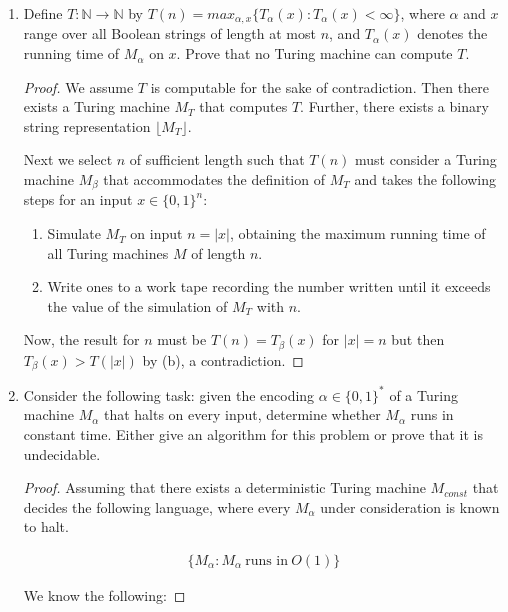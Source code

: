\documentclass[usletter]{article}
\begin{document}
\begin{enumerate}
  \item Define $T : \mathbb{N} \rightarrow \mathbb{N}$ by $T(n) = max_{\alpha,x}\{T_{\alpha}(x) : T_{\alpha}(x) < \infty \}$, where $\alpha$ and $x$ range over all Boolean strings of length at most $n$, and $T_{\alpha}(x)$ denotes the running time of $M_{\alpha}$ on $x$. Prove that no Turing machine can compute $T$.

    \begin{proof}
      We assume $T$ is computable for the sake of contradiction. Then there exists a Turing machine $M_T$ that computes $T$. Further, there exists a binary string representation $\lfloor M_T \rfloor$.

      Next we select $n$ of sufficient length such that $T(n)$ must consider a Turing machine $M_{\beta}$ that accommodates the definition of $M_T$ and takes the following steps for an input $x \in \{0,1\}^n$:
      \begin{enumerate}
        \item Simulate $M_T$ on input $n = |x|$, obtaining the maximum running time of all Turing machines $M$ of length $n$.
        \item Write ones to a work tape recording the number written until it exceeds the value of the simulation of $M_T$ with $n$.
      \end{enumerate}

      Now, the result for $n$ must be $T(n) = T_{\beta}(x)$ for $|x| = n$ but then $T_{\beta}(x) > T(|x|)$ by (b), a contradiction.
    \end{proof}

  \item Consider the following task: given the encoding $\alpha \in \{0,1\}^*$ of a Turing machine $M_{\alpha}$ that halts on every input, determine whether $M_{\alpha}$ runs in constant time. Either give an algorithm for this problem or prove that it is undecidable.

    \begin{proof}
      Assuming that there exists a deterministic Turing machine $M_{const}$ that decides the following language, where every $M_{\alpha}$ under consideration is known to halt.

      \begin{align}
        \{ M_{\alpha} : M_{\alpha}\ \text{runs in}\ O(1)\}
      \end{align}

      We know the following:


\end{proof}
\end{enumerate}
\end{document}
